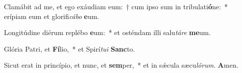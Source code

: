 \item Clamábit ad me, et ego exáudiam eum:~† cum ipso sum in tribulati\textbf{ó}ne:~* erípiam eum et glorifi\textit{cábo} \textbf{e}um.

\item Longitúdine diérum replébo \textbf{e}um:~* et osténdam illi salu\textit{táre} \textbf{me}um.

\item Glória Patri, et \textbf{Fí}lio,~* et Spirí\textit{tui} \textbf{Sanc}to.

\item Sicut erat in princípio, et nunc, et \textbf{sem}per,~* et in sǽcula sæcu\textit{lórum}. \textbf{A}men.

